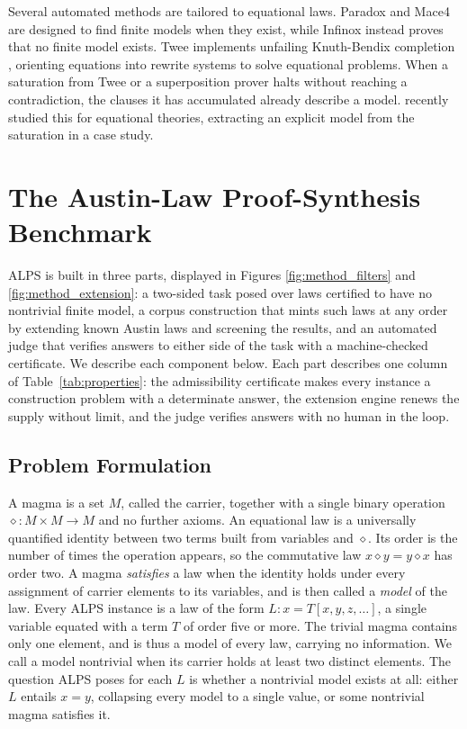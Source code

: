 \documentclass[letterpaper]{article} %
\newcommand{\op}{\diamond}
\begin{document}
Several automated methods are tailored to equational laws. Paradox and Mace4 \citep{claessen2003new, mccune2003mace4} are designed to find finite models when they exist, while Infinox \citep{claessen2011automated} instead proves that no finite model exists. Twee \citep{smallbone2021twee} implements unfailing Knuth-Bendix completion \citep{knuth1970simple, bachmair1989completion}, orienting equations into rewrite systems to solve equational problems. When a saturation from Twee or a superposition prover halts without reaching a contradiction, the clauses it has accumulated already describe a model. \citet{janota2026case} recently studied this for equational theories, extracting an explicit model from the saturation in a case study. 


\section{The Austin-Law Proof-Synthesis Benchmark}


ALPS is built in three parts, displayed in Figures \ref{fig:method_filters} and \ref{fig:method_extension}: a two-sided task posed over laws certified to have no nontrivial finite model, a corpus construction that mints such laws at any order by extending known Austin laws and screening the results, and an automated judge that verifies answers to either side of the task with a machine-checked certificate. We describe each component below. Each part describes one column of Table~\ref{tab:properties}: the admissibility certificate makes every instance a construction problem with a determinate answer, the extension engine renews the supply without limit, and the judge verifies answers with no human in the loop.

\subsection{Problem Formulation}


A magma is a set $M$, called the carrier, together with a single binary operation ${\op}\colon M \times M \to M$ and no further axioms. An equational law is a universally quantified identity between two terms built from variables and $\op$. Its order is the number of times the operation appears, so the commutative law $x \op y = y \op x$ has order two. A magma \textit{satisfies} a law when the identity holds under every assignment of carrier elements to its variables, and is then called a \textit{model} of the law.
Every ALPS instance is a law of the form $L\colon x = T[x, y, z, \dots]$, a single variable equated with a term $T$ of order five or more. The trivial magma contains only one element, and is thus a model of every law, carrying no information. We call a model nontrivial when its carrier holds at least two distinct elements. The question ALPS poses for each $L$ is whether a nontrivial model exists at all: either $L$ entails $x = y$, collapsing every model to a single value, or some nontrivial magma satisfies it.
\end{document}
